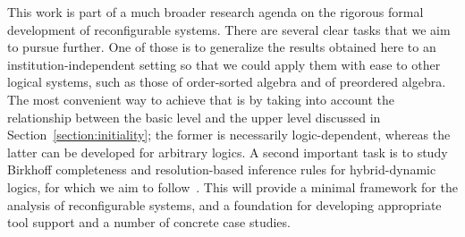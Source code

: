 \documentclass[a4paper,UKenglish,cleveref,autoref]{lipics-v2019}
\begin{document}
This work is part of a much broader research agenda on the rigorous formal development of reconfigurable systems.
There are several clear tasks that we aim to pursue further.
One of those is to generalize the results obtained here to an institution-independent setting so that we could apply them with ease to other logical systems, such as those of order-sorted algebra and of preordered algebra.
The most convenient way to achieve that is by taking into account the relationship between the basic level and the upper level discussed in Section~\ref{section:initiality}; the former is necessarily logic-dependent, whereas the latter can be developed for arbitrary logics.
A second important task is to study Birkhoff completeness and resolution-based inference rules for hybrid-dynamic logics, for which we aim to follow~\cite{Gaina17Bir,TutuF17}.
This will provide a minimal framework for the analysis of reconfigurable systems, and a foundation for developing appropriate tool support and a number of concrete case studies.




\end{document}
